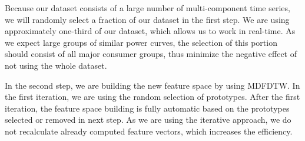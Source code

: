 Because our dataset consists of a large number of multi-component time series, we will randomly select a fraction of our dataset in the first step. We are using approximately one-third of our dataset, which allows us to work in real-time. As we expect large groups of similar power curves, the selection of this portion should consist of all major consumer groups, thus minimize the negative effect of not using the whole dataset.

In the second step, we are building the new feature space by using MDFDTW. In the first iteration, we are using the random selection of prototypes. After the first iteration, the feature space building is fully automatic based on the prototypes selected or removed in next step. As we are using the iterative approach, we do not recalculate already computed feature vectors, which increases the efficiency.

